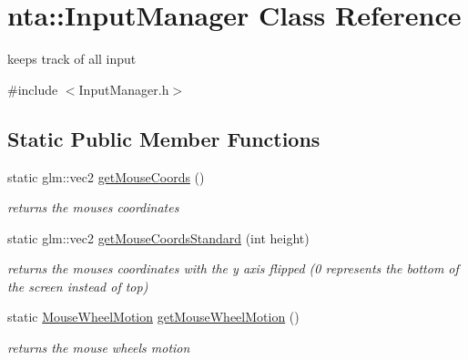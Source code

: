 \hypertarget{classnta_1_1InputManager}{}\section{nta\+:\+:Input\+Manager Class Reference}
\label{classnta_1_1InputManager}


keeps track of all input  




{\ttfamily \#include $<$Input\+Manager.\+h$>$}

\subsection*{Static Public Member Functions}
\begin{DoxyCompactItemize}
\item 
\mbox{\label{classnta_1_1InputManager_abaa04adc67f8025133fd1360b171b95f}} 
static glm\+::vec2 \hyperlink{classnta_1_1InputManager_abaa04adc67f8025133fd1360b171b95f}{get\+Mouse\+Coords} ()
\begin{DoxyCompactList}\small\item\em returns the mouse\textquotesingle{}s coordinates \end{DoxyCompactList}\item 
\mbox{\label{classnta_1_1InputManager_a899371ac784e0a1aeb6f9dc1e7f0f58c}} 
static glm\+::vec2 \hyperlink{classnta_1_1InputManager_a899371ac784e0a1aeb6f9dc1e7f0f58c}{get\+Mouse\+Coords\+Standard} (int height)
\begin{DoxyCompactList}\small\item\em returns the mouse\textquotesingle{}s coordinates with the y axis flipped (0 represents the bottom of the screen instead of top) \end{DoxyCompactList}\item 
\mbox{\label{classnta_1_1InputManager_a9f308e79f224806eb923ce2ef0f8023a}} 
static \hyperlink{namespacenta_aabafd53ba7264997db9e6e934a8ade2b}{Mouse\+Wheel\+Motion} \hyperlink{classnta_1_1InputManager_a9f308e79f224806eb923ce2ef0f8023a}{get\+Mouse\+Wheel\+Motion} ()
\begin{DoxyCompactList}\small\item\em returns the mouse wheel\textquotesingle{}s motion \end{DoxyCompactList}\item 

\end{DoxyCompactItemize}
